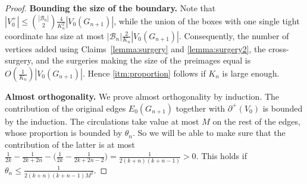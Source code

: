 \documentclass[10pt,a4paper]{amsart}
\begin{document}
\begin{proof}
{\bf Bounding the size of the boundary.} Note that $|V_0^+| \leq {|\mathcal{B}_n| \choose 2} \frac{4}{K_n^2}|V_0(G_{n+1})|$, while the union of the boxes with one single tight coordinate has size at most 
$|\mathcal{B}_n| \frac{2}{K_n}|V_0(G_{n+1})|$.
Consequently, the number of vertices added using Claims~\ref{lemma:surgery} and \ref{lemma:surgery2}, the cross-surgery, and the surgeries making the size of the preimages equal  is  $O(\frac{1}{K_n})|V_0(G_{n+1})|$. Hence \ref{itm:proportion} follows if $K_n$ is large enough.

{\bf Almost orthogonality.} We prove almost orthogonality by induction. The contribution of the original edges $E_0(G_{n+1})$ together with $\partial^+(V_0)$ is bounded by the induction. The circulations take value at most $M$ on the rest of the edges, whose proportion is bounded by $\theta_n$. So we will be able to make sure that the contribution of the latter is at most $\frac{1}{2k}-\frac{1}{2k+2n} - \big(\frac{1}{2k}-\frac{1}{2k+2n-2}\big)=\frac{1}{2(k+n)(k+n-1)}>0$. This holds if $\theta_n \leq \frac{1}{2(k+n)(k+n-1)M^2}$. 
\end{proof} 
\end{document}
